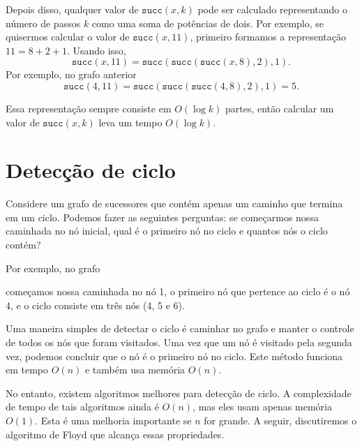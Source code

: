 Depois disso, qualquer valor de $\texttt{succ}(x,k)$ pode ser calculado
representando o número de passos $k$ como uma soma de potências de dois.
Por exemplo, se quisermos calcular o valor de $\texttt{succ}(x,11)$,
primeiro formamos a representação $11=8+2+1$.
Usando isso,
\[\texttt{succ}(x,11)=\texttt{succ}(\texttt{succ}(\texttt{succ}(x,8),2),1).\]
Por exemplo, no grafo anterior
\[\texttt{succ}(4,11)=\texttt{succ}(\texttt{succ}(\texttt{succ}(4,8),2),1)=5.\]

Essa representação sempre consiste em
$O(\log k)$ partes, então calcular um valor de $\texttt{succ}(x,k)$
leva um tempo $O(\log k)$.

\section{Detecção de ciclo}


Considere um grafo de sucessores que contém apenas
um caminho que termina em um ciclo.
Podemos fazer as seguintes perguntas:
se começarmos nossa caminhada no nó inicial,
qual é o primeiro nó no ciclo
e quantos nós o ciclo contém?

Por exemplo, no grafo

\begin{center}
\end{center}
começamos nossa caminhada no nó 1,
o primeiro nó que pertence ao ciclo é o nó 4, e o ciclo consiste
em três nós (4, 5 e 6).

Uma maneira simples de detectar o ciclo é caminhar no
grafo e manter o controle de
todos os nós que foram visitados. Uma vez que um nó é visitado
pela segunda vez, podemos concluir
que o nó é o primeiro nó no ciclo.
Este método funciona em tempo $O(n)$ e também usa
memória $O(n)$.

No entanto, existem algoritmos melhores para detecção de ciclo.
A complexidade de tempo de tais algoritmos ainda é $O(n)$,
mas eles usam apenas memória $O(1)$.
Esta é uma melhoria importante se $n$ for grande.
A seguir, discutiremos o algoritmo de Floyd que
alcança essas propriedades.

